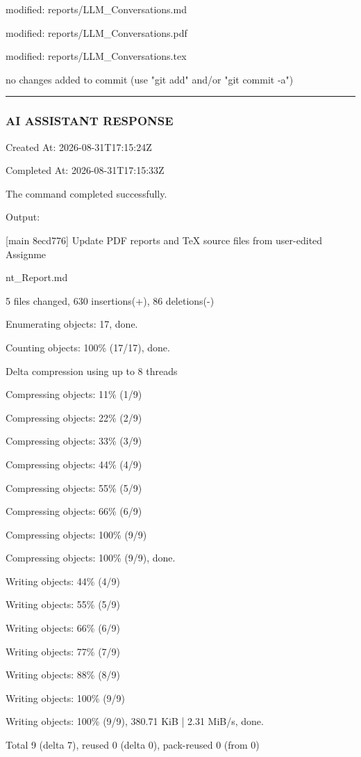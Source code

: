\documentclass[11pt,a4paper]{article}
\begin{document}
modified:   reports/LLM\_Conversations.md

modified:   reports/LLM\_Conversations.pdf

modified:   reports/LLM\_Conversations.tex


no changes added to commit (use "git add" and/or "git commit -a")


\hrule

\subsubsection{AI ASSISTANT RESPONSE}

Created At: 2026-08-31T17:15:24Z

Completed At: 2026-08-31T17:15:33Z


The command completed successfully.

Output:

[main 8ecd776] Update PDF reports and TeX source files from user-edited Assignme

nt\_Report.md

5 files changed, 630 insertions(+), 86 deletions(-)

Enumerating objects: 17, done.

Counting objects: 100\% (17/17), done.

Delta compression using up to 8 threads

Compressing objects:  11\% (1/9)

Compressing objects:  22\% (2/9)

Compressing objects:  33\% (3/9)

Compressing objects:  44\% (4/9)

Compressing objects:  55\% (5/9)

Compressing objects:  66\% (6/9)

Compressing objects: 100\% (9/9)

Compressing objects: 100\% (9/9), done.

Writing objects:  44\% (4/9)

Writing objects:  55\% (5/9)

Writing objects:  66\% (6/9)

Writing objects:  77\% (7/9)

Writing objects:  88\% (8/9)

Writing objects: 100\% (9/9)

Writing objects: 100\% (9/9), 380.71 KiB | 2.31 MiB/s, done.

Total 9 (delta 7), reused 0 (delta 0), pack-reused 0 (from 0)
\end{document}
